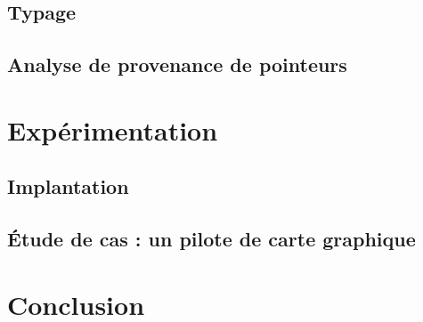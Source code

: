 \documentclass[a4paper,11pt]{memoir}
\begin{document}
\label{cha:lang}


\chapter{Typage}

\label{cha:typbase}



%

\chapter{Analyse de provenance de pointeurs}

\label{cha:qualifs}



%

\label{cha:ccl2}


\part{Expérimentation}
\label{part:xp}



\chapter{Implantation}

\label{cha:implem}


\chapter{Étude de cas : un pilote de carte graphique}

\label{cha:etudedecas}


%

\part{Conclusion}
\end{document}
